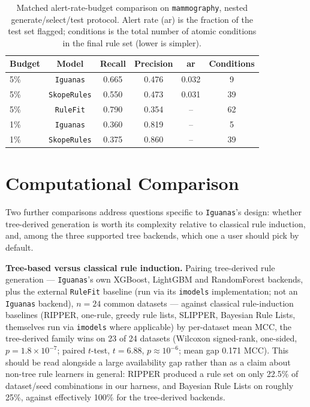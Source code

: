 \documentclass[twoside,11pt]{article}
\begin{document}
\begin{table}[t]
\centering
\caption{Matched alert-rate-budget comparison on \texttt{mammography}, nested
generate/select/test protocol. Alert rate (ar) is the fraction of the test
set flagged; conditions is the total number of atomic conditions in the
final rule set (lower is simpler).}
\label{tab:mammography}
\begin{tabular}{lccccc}
\hline
\textbf{Budget} & \textbf{Model} & \textbf{Recall} & \textbf{Precision} & \textbf{ar} & \textbf{Conditions} \\
\hline
5\%  & \texttt{Iguanas}    & 0.665 & 0.476 & 0.032 & 9 \\
5\%  & \texttt{SkopeRules} & 0.550 & 0.473 & 0.031 & 39 \\
5\%  & \texttt{RuleFit}    & 0.790 & 0.354 & --    & 62 \\
\hline
1\%  & \texttt{Iguanas}    & 0.360 & 0.819 & --    & 5 \\
1\%  & \texttt{SkopeRules} & 0.375 & 0.860 & --    & 39 \\
\hline
\end{tabular}
\end{table}

\section{Computational Comparison}
\label{sec:compcompare}

Two further comparisons address questions specific to \texttt{Iguanas}'s
design: whether tree-derived generation is worth its complexity relative to
classical rule induction, and, among the three supported tree backends, which
one a user should pick by default.

\textbf{Tree-based versus classical rule induction.} Pairing tree-derived
rule generation --- \texttt{Iguanas}'s own XGBoost, LightGBM and RandomForest
backends, plus the external \texttt{RuleFit} baseline (run via its
\texttt{imodels} implementation; not an \texttt{Iguanas} backend), $n=24$
common datasets --- against classical rule-induction baselines (RIPPER,
one-rule, greedy rule lists, SLIPPER, Bayesian Rule Lists, themselves run via
\texttt{imodels} where applicable) by per-dataset mean MCC, the tree-derived
family wins on 23 of 24 datasets
(Wilcoxon signed-rank, one-sided, $p = 1.8\times10^{-7}$; paired $t$-test,
$t=6.88$, $p\approx10^{-6}$; mean gap 0.171 MCC). This should be read
alongside a large availability gap rather than as a claim about non-tree rule
learners in general: RIPPER produced a rule set on only 22.5\% of
dataset/seed combinations in our harness, and Bayesian Rule Lists on roughly
25\%, against effectively 100\% for the tree-derived backends.
\end{document}
